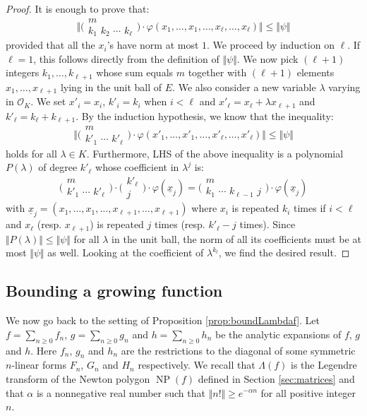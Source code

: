 \documentclass{sig-alternate}
\DeclareMathOperator{\NP}{NP}
\renewcommand{\O}{\mathcal O}
\def\binom#1#2{\Big(\begin{array}{cc} #1 \\ #2 \end{array}\Big)}
\begin{document}
\begin{proof}
It is enough to prove that:
$$\Big\Vert \binom m {k_1 \,\, k_2 \,\, \cdots \,\, k_\ell} \cdot
\varphi(x_1, \ldots, x_1, \ldots, x_\ell, \ldots,
x_\ell) \Big\Vert \leq \Vert \psi \Vert$$
provided that all the $x_i$'s have norm at most $1$. We proceed by 
induction on 
$\ell$. If $\ell = 1$, this follows directly from
the definition of $\Vert \psi \Vert$. 
We now pick $(\ell+1)$ integers $k_1, \ldots, k_{\ell+1}$ whose sum 
equals $m$ together with $(\ell+1)$ elements $x_1, \ldots, x_{\ell+1}$
lying in the unit ball of $E$.
We also consider a new variable $\lambda$ varying in
$\O_K$. We set $x'_i = x_i$, $k'_i = k_i$ when $i < \ell$ and $x'_\ell 
= x_\ell + \lambda x_{\ell+1}$ and $k'_\ell = k_\ell + k_{\ell+1}$. By the 
induction hypothesis, we know that the inequality:
$$\Big\Vert \binom m {k'_1 \,\, \cdots \,\, k'_\ell} \cdot
\varphi(x'_1, \ldots, x'_1, \ldots, x'_\ell, \ldots, x'_\ell) \Big\Vert
\leq \Vert \psi \Vert$$
holds for all $\lambda \in K$. Furthermore, LHS of the above inequality
is a polynomial $P(\lambda)$ of degree $k'_\ell$ whose coefficient in 
$\lambda^j$ is:
$$\binom m {k'_1 \,\, \cdots \,\, k'_\ell} \cdot
\binom {k'_\ell} {j} \cdot
\varphi(\underline x_j) = 
\binom m {k_1 \,\, \cdots \,\, k_{\ell-1} \,\, j} \cdot
\varphi(\underline x_j)$$
with
$\underline x_j = (x_1, \ldots, x_1, \ldots, x_{\ell+1}, \ldots, 
x_{\ell+1})$
where $x_i$ is repeated $k_i$ times if $i < \ell$ and $x_\ell$ 
(resp. $x_{\ell+1}$) is repeated $j$ times (resp. $k'_\ell - j$ times).
Since $\Vert P(\lambda) \Vert \leq \Vert \psi \Vert$ for all $\lambda$ in 
the unit ball, the norm of all its coefficients must be at most $\Vert \psi
\Vert$ as well. Looking at the coefficient of $\lambda^{k_l}$, we find
the desired result.
\end{proof}

\subsection{Bounding a growing function}

We now go back to the setting of Proposition \ref{prop:boundLambdaf}.
Let $f = \sum_{n \geq 0} f_n$, $g = \sum_{n \geq 0} g_n$ and
$h = \sum_{n \geq 0} h_n$ be the analytic expansions of
$f$, $g$ and $h$.
Here $f_n$, $g_n$ and $h_n$ are the restrictions to the diagonal of 
some symmetric $n$-linear forms $F_n$, $G_n$ and $H_n$ respectively.
We recall that $\Lambda(f)$ 
is the Legendre transform of the Newton polygon $\NP(f)$ defined in Section \ref{sec:matrices}
\cite[Proposition 3.9]{caruso-roe-vaccon:14a} and that $\alpha$ is a nonnegative
real number such that $\Vert n! \Vert \geq e^{-\alpha n}$ for all positive integer $n$.
\end{document}
